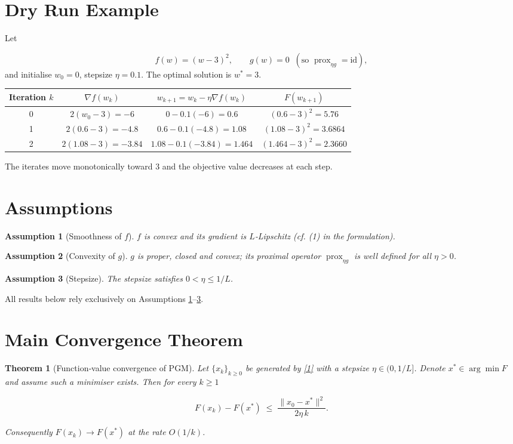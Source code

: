 \documentclass{article}
\newtheorem{theorem}{Theorem}
\newtheorem{assumption}{Assumption}
\newcommand{\prox}{\operatorname{prox}}
\begin{document}
\section*{Dry Run Example}
Let  

\[
f(w)=(w-3)^{2},\qquad g(w)=0\;\;(\text{so }\prox_{\eta g}= \text{id}),
\]
and initialise $w_{0}=0$, stepsize $\eta=0.1$.
The optimal solution is $w^{*}=3$.

\begin{center}
\begin{tabular}{c|c|c|c}
Iteration $k$ & $\nabla f(w_{k})$ & $w_{k+1}=w_{k}-\eta\nabla f(w_{k})$ & $F(w_{k+1})$\\ \hline
0 & $2(w_{0}-3) = -6$ & $0-0.1(-6)=0.6$ & $(0.6-3)^{2}=5.76$\\
1 & $2(0.6-3)=-4.8$ & $0.6-0.1(-4.8)=1.08$ & $(1.08-3)^{2}=3.6864$\\
2 & $2(1.08-3)=-3.84$ & $1.08-0.1(-3.84)=1.464$ & $(1.464-3)^{2}=2.3660$\\
\end{tabular}
\end{center}

The iterates move monotonically toward $3$ and the objective value decreases at each step.

\newpage
\section*{Assumptions}
\begin{assumption}[Smoothness of $f$]\label{as:lip}
$f$ is convex and its gradient is $L$‑Lipschitz (cf. (1) in the formulation).
\end{assumption}
\begin{assumption}[Convexity of $g$]\label{as:convexg}
$g$ is proper, closed and convex; its proximal operator $\prox_{\eta g}$ is well defined for all $\eta>0$.
\end{assumption}
\begin{assumption}[Stepsize]\label{as:stepsize}
The stepsize satisfies $0<\eta\le 1/L$.
\end{assumption}
All results below rely exclusively on Assumptions \ref{as:lip}–\ref{as:stepsize}.

\section*{Main Convergence Theorem}
\begin{theorem}[Function‑value convergence of PGM]\label{thm:main}
Let $\{x_{k}\}_{k\ge0}$ be generated by \eqref{1} with a stepsize $\eta\in(0,1/L]$.  
Denote $x^{*}\in\arg\min F$ and assume such a minimiser exists. Then for every $k\ge1$  

\[
F(x_{k})-F(x^{*})\;\le\;\frac{\|x_{0}-x^{*}\|^{2}}{2\eta\,k}.
\tag{3}
\]

Consequently $F(x_{k})\to F(x^{*})$ at the rate $O(1/k)$.
\end{theorem}
\end{document}
